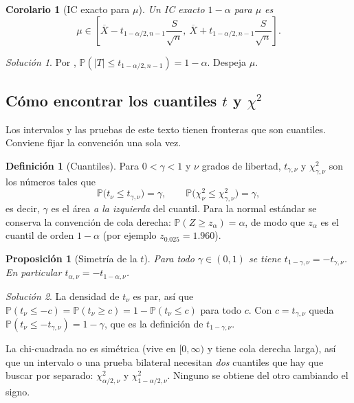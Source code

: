 \documentclass[11pt]{article}
\theoremstyle{plain}
\newtheorem{proposition}[theorem]{Proposición}
\newtheorem{corollary}[theorem]{Corolario}
\theoremstyle{definition}
\newtheorem{definition}[theorem]{Definición}
\theoremstyle{remark}
\theoremstyle{solstyle}
\newtheorem*{solution}{Solución}
\newcommand{\Pbb}{\mathbb{P}}
\newcommand{\1}{\mathbbm{1}}
\newcommand{\Xbar}{\overline{X}}
\begin{document}
\begin{corollary}[IC exacto para $\mu$]\label{cor:CImuExact}
Un IC exacto $1-\alpha$ para $\mu$ es
\[
\mu\in \left[\Xbar - t_{1-\alpha/2,n-1}\frac{S}{\sqrt n},\ \Xbar + t_{1-\alpha/2,n-1}\frac{S}{\sqrt n}\right].
\]
\end{corollary}

\begin{solution}
Por , $\Pbb(|T|\le t_{1-\alpha/2,n-1})=1-\alpha$. Despeja $\mu$.
\end{solution}

\subsection{Cómo encontrar los cuantiles $t$ y $\chi^2$}\label{subsec:cuantiles}

Los intervalos y las pruebas de este texto tienen fronteras que son cuantiles. Conviene fijar la convención una sola vez.

\begin{definition}[Cuantiles]
Para $0<\gamma<1$ y $\nu$ grados de libertad, $t_{\gamma,\nu}$ y $\chi^2_{\gamma,\nu}$ son los números tales que
\[
\Pbb\bigl(t_\nu\le t_{\gamma,\nu}\bigr)=\gamma,
\qquad
\Pbb\bigl(\chi^2_\nu\le \chi^2_{\gamma,\nu}\bigr)=\gamma ,
\]
es decir, $\gamma$ es el área \emph{a la izquierda} del cuantil. Para la normal estándar se conserva la convención de cola derecha: $\Pbb(Z\ge z_\alpha)=\alpha$, de modo que $z_\alpha$ es el cuantil de orden $1-\alpha$ (por ejemplo $z_{0.025}=1.960$).
\end{definition}

\begin{proposition}[Simetría de la $t$]\label{prop:tsym}
Para todo $\gamma\in(0,1)$ se tiene $t_{1-\gamma,\nu}=-t_{\gamma,\nu}$. En particular $t_{\alpha,\nu}=-t_{1-\alpha,\nu}$.
\end{proposition}

\begin{solution}
La densidad de $t_\nu$ es par, así que $\Pbb(t_\nu\le -c)=\Pbb(t_\nu\ge c)=1-\Pbb(t_\nu\le c)$ para todo $c$. Con $c=t_{\gamma,\nu}$ queda $\Pbb(t_\nu\le -t_{\gamma,\nu})=1-\gamma$, que es la definición de $t_{1-\gamma,\nu}$.
\end{solution}

La chi-cuadrada no es simétrica (vive en $[0,\infty)$ y tiene cola derecha larga), así que un intervalo o una prueba bilateral necesitan \emph{dos} cuantiles que hay que buscar por separado: $\chi^2_{\alpha/2,\nu}$ y $\chi^2_{1-\alpha/2,\nu}$. Ninguno se obtiene del otro cambiando el signo.
\end{document}
